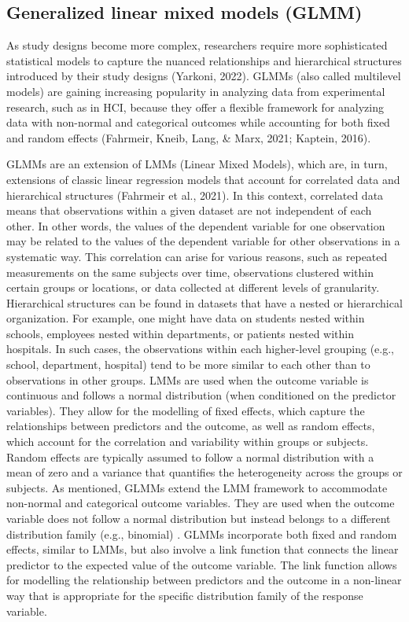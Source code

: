 \documentclass[
  man,floatsintext]{apa6}
\begin{document}
\hypertarget{generalized-linear-mixed-models-glmm}{%
\subsection{Generalized linear mixed models (GLMM)}\label{generalized-linear-mixed-models-glmm}}

As study designs become more complex, researchers require more sophisticated statistical models to capture the nuanced relationships and hierarchical structures introduced by their study designs (Yarkoni, 2022). GLMMs (also called multilevel models) are gaining increasing popularity in analyzing data from experimental research, such as in HCI, because they offer a flexible framework for analyzing data with non-normal and categorical outcomes while accounting for both fixed and random effects (Fahrmeir, Kneib, Lang, \& Marx, 2021; Kaptein, 2016).

GLMMs are an extension of LMMs (Linear Mixed Models), which are, in turn, extensions of classic linear regression models that account for correlated data and hierarchical structures (Fahrmeir et al., 2021). In this context, correlated data means that observations within a given dataset are not independent of each other. In other words, the values of the dependent variable for one observation may be related to the values of the dependent variable for other observations in a systematic way. This correlation can arise for various reasons, such as repeated measurements on the same subjects over time, observations clustered within certain groups or locations, or data collected at different levels of granularity. Hierarchical structures can be found in datasets that have a nested or hierarchical organization. For example, one might have data on students nested within schools, employees nested within departments, or patients nested within hospitals. In such cases, the observations within each higher-level grouping (e.g., school, department, hospital) tend to be more similar to each other than to observations in other groups.
LMMs are used when the outcome variable is continuous and follows a normal distribution (when conditioned on the predictor variables). They allow for the modelling of fixed effects, which capture the relationships between predictors and the outcome, as well as random effects, which account for the correlation and variability within groups or subjects. Random effects are typically assumed to follow a normal distribution with a mean of zero and a variance that quantifies the heterogeneity across the groups or subjects.
As mentioned, GLMMs extend the LMM framework to accommodate non-normal and categorical outcome variables. They are used when the outcome variable does not follow a normal distribution but instead belongs to a different distribution family (e.g., binomial) . GLMMs incorporate both fixed and random effects, similar to LMMs, but also involve a link function that connects the linear predictor to the expected value of the outcome variable. The link function allows for modelling the relationship between predictors and the outcome in a non-linear way that is appropriate for the specific distribution family of the response variable.
\end{document}
